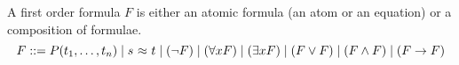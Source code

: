 
\begin{definition}\label{def:first-order}
A {\myem first order formula} $F$ is either an 
{\myem atomic formula} (an atom or an equation)
or a composition of formulae.
%
\[
 F ::= P(t_1,\ldots,t_n) \mid
	s\ {\mathsf \approx}\ t \mid
	(\lnot F) \mid 
	(\forall x F) \mid
	(\exists x F) \mid
	(F\lor F) \mid
	(F\land F) \mid
	(F\rightarrow F)
\]
\end{definition}